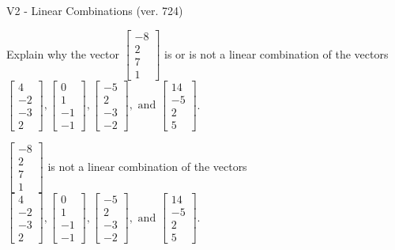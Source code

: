 \begin{exercise}
  \begin{exerciseTitle}V2 - Linear Combinations (ver. 724)\end{exerciseTitle}
  \begin{exerciseStatement}
    Explain why the vector \(\left[\begin{array}{c}
-8 \\
2 \\
7 \\
1
\end{array}\right]\)  is or is not a linear 
	combination of the vectors \(\left[\begin{array}{c}
4 \\
-2 \\
-3 \\
2
\end{array}\right] , \left[\begin{array}{c}
0 \\
1 \\
-1 \\
-1
\end{array}\right] , \left[\begin{array}{c}
-5 \\
2 \\
-3 \\
-2
\end{array}\right] , \text{ and } \left[\begin{array}{c}
14 \\
-5 \\
2 \\
5
\end{array}\right]\).
	


  \end{exerciseStatement}
  \begin{exerciseAnswer}
   \(\left[\begin{array}{c}
-8 \\
2 \\
7 \\
1
\end{array}\right]\) 
  	 is not  
	a linear combination of the vectors \(\left[\begin{array}{c}
4 \\
-2 \\
-3 \\
2
\end{array}\right] , \left[\begin{array}{c}
0 \\
1 \\
-1 \\
-1
\end{array}\right] , \left[\begin{array}{c}
-5 \\
2 \\
-3 \\
-2
\end{array}\right] , \text{ and } \left[\begin{array}{c}
14 \\
-5 \\
2 \\
5
\end{array}\right]\).


\end{exerciseAnswer}
\end{exercise}
